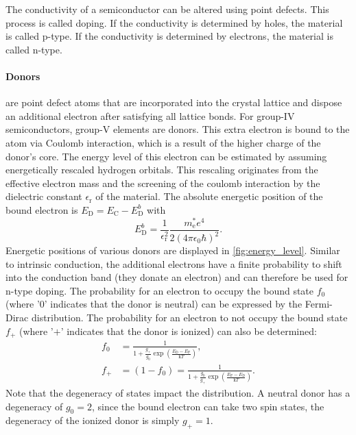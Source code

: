 The conductivity of a semiconductor can be altered using
point defects.
This process is called doping.
If the conductivity is determined by holes, the material is
called p-type.
If the conductivity is determined by electrons, the material
is called n-type.

\paragraph{Donors} are point defect atoms that are incorporated into the crystal
lattice and dispose an additional electron after satisfying all
lattice bonds.
For group-$\mathrm{IV}$ semiconductors, group-$\mathrm{V}$ elements
are donors.
This extra electron is bound to the atom via Coulomb interaction,
which is a result of the higher charge of the donor's core.
The energy level of this electron can be estimated by assuming
energetically rescaled hydrogen orbitals.
This rescaling originates from the effective electron mass and
the screening of the coulomb interaction by the dielectric constant 
$\epsilon_{\mathrm{r}}$ of the material.
The absolute energetic position of the bound electron is
$E_{\mathrm{D}}=E_{\mathrm{C}}-E_{\mathrm{D}}^{b}$ with
\begin{equation}
	E_{\mathrm{D}}^{b}=
	\frac{1}{\epsilon_{\mathrm{r}}^{2}}
	\frac{m_{\mathrm{e}}^{*} e^{4}}{2(4\pi\epsilon_{0}\hbar)^{2}}.
\end{equation}
Energetic positions of various donors are displayed in
\cref{fig:energy_level}.
Similar to intrinsic conduction, the additional electrons have a
finite probability to shift into the conduction band
(they donate an electron) and
can therefore be used for n-type doping.
The probability for an electron to occupy the bound state $f_0$
(where '$0$' indicates that the donor is neutral) can be expressed
by the Fermi-Dirac distribution.
The probability for an electron to not occupy the bound state $f_+$
(where '$+$' indicates that the donor is ionized) can also be
determined:
\begin{align}
	f_{0} & =\frac{1}{1+\frac{g_{+}}{g_{0}}\exp\left(
	\frac{E_{\mathrm{D}}-E_{\mathrm{F}}}{\mathrm{k}T}\right)},  \\
	\label{eq:fplus}
	f_{+} & =(1-f_{0})=\frac{1}{1+\frac{g_{0}}{g_{+}}\exp\left(
		\frac{E_{\mathrm{F}}-E_{\mathrm{D}}}{\mathrm{k}T} \right)}.
\end{align}
Note that the degeneracy of states impact the distribution.
A neutral donor has a degeneracy of $g_0=2$, since the bound
electron can take two spin states, the degeneracy of the
ionized donor is simply $g_+=1$.

